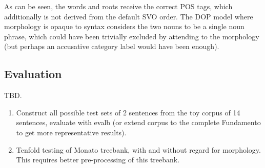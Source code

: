 \documentclass[10pt,a4paper]{article}
\begin{document}
As can be seen, the words and roots receive the correct POS tags, which
additionally is not derived from the default SVO order.
The DOP model where morphology is opaque to syntax considers the two nouns
to be a single noun phrase, which could have been trivially excluded by
attending to the morphology (but perhaps an accusative category label would
have been enough).

\begin{comment}
\subsection{Todo}

\item parse bitpar chart output into NLTK (currently only most probable derivation; 
  we need $n$ most probable parses and maybe shortest derivation, SL-DOP etc.)
\item use Reta Vortaro / ergane Esperanto dictionary and root lists 
  to induce segmentation / morphology model in a semi-supervised fashion.
\item check morphology coverage against vocabulary of Monato treebank
\item distinguish between morpheme and word boundaries (how?).
  possibly by having a trailing space as part of a morphological analysis 
  (but: this should not block inflection for plurality and accusative (+j and +n respectively).
\item finish report; evaluation \& conclusion.
  write about Dasgupta (2008) \& is there work on DOP + dependencies? 
  mention DLT as older exemplar model (prior art?).
\item look at DOP* / U-DOP
\end{comment}


\subsection{Evaluation}

TBD. 

\begin{enumerate}
\item Construct all possible test sets of 2 sentences from the toy corpus of 14
sentences, evaluate with evalb (or extend corpus to the complete
Fundamento to get more representative results).
\item Tenfold testing of Monato treebank, with and without regard for
morphology. This requires better pre-processing of this treebank.
\end{enumerate}
\end{document}
